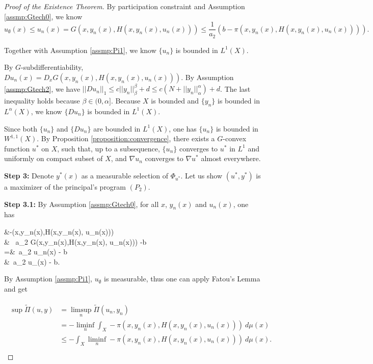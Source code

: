 \begin{proof}[Proof of the Existence Theorem]
	By participation constraint and Assumption \ref{assmp:Gtech0}, we know 
	\begin{equation*}
	u_{\emptyset}(x) \le u_n(x) = G(x,y_n(x),H(x,y_n(x),u_n(x))) \le \frac{1}{a_2}(b - \pi(x,y_n(x),H(x,y_n(x),u_n(x)))).
	\end{equation*}

	Together with Assumption \ref{assmp:Pi1}, we know $\{u_n\}$ is bounded in $L^1(X)$.\medskip

	By $G$-subdifferentiability, $Du_n(x) = D_x G(x, y_n(x), H(x,y_n(x),u_n(x)))$. By Assumption \ref{assmp:Gtech2}, we have $||Du_n||_{1}\le c||y_n||_{\beta}^{\beta}+d \le c(N+||y_n||_{\alpha}^{\alpha})+d$. The last inequality holds because $\beta \in (0, \alpha]$. Because $X$ is bounded and $\{y_n\}$ is bounded in $L^{\alpha}(X)$, we know $\{Du_n\}$ is bounded in $L^1(X)$.\medskip
	
	Since both $\{u_n\}$ and $\{Du_n\}$ are bounded in $L^1(X)$, one has $\{u_n\}$ is bounded in $W^{1,1}(X)$. By Proposition \ref{proposition:convergence}, there exists a $G$-convex function $u^*$ on $X$, such that, up to a subsequence, $\{u_n\}$ converges to $u^*$ in $L^1$ and uniformly on compact subset of $X$, and $\nabla u_n$ converges to $\nabla u^*$ almost everywhere.\medskip
	
	{\bf Step 3: } Denote $y^*(x)$ as a measurable selection of $\Phi_{u^*}$. Let us show $(u^*,y^*)$ is a maximizer of the principal's program $(P_2)$. \medskip
	
	{\bf Step 3.1: }By Assumption \ref{assmp:Gtech0}, for all $x$, $y_n(x)$ and $u_n(x)$,
	one has
	\begin{flalign*}
	&-\pi(x,y_n(x),H(x,y_n(x), u_n(x)))\\
	\ge & \ a_2 G(x,y_n(x),H(x,y_n(x), u_n(x))) -b \\
	=&\  a_2 u_n(x) - b \\
	\ge&\ a_2 u_{\emptyset}(x) - b.
	\end{flalign*}

 
	By Assumption \ref{assmp:Pi1}, $u_{\emptyset}$ is measurable, thus one can apply Fatou's Lemma and get
	
	\begin{align}\label{3}
	\begin{split}
	\sup \tilde{\Pi}(u,y) & = \limsup\limits_{n} \tilde{\Pi}(u_n, y_n) \\
	&= -\liminf\limits_{n} \int_{X} - \pi(x, y_n(x), H(x,y_n(x),u_n(x)))  ~d\mu(x)\\
	& \le - \int_{X} \liminf\limits_{n} - \pi(x, y_n(x), H(x,y_n(x),u_n(x)))~ d\mu(x). \\
	\end{split}
	\end{align}
	

\end{proof}
